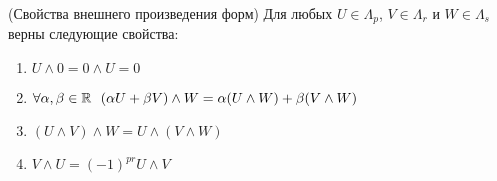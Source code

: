 \begin{theorem} (Свойства внешнего произведения форм)
	Для любых $U \in \Lambda_p$, $V \in \Lambda_r$ и $W \in \Lambda_s$ верны следующие свойства:
	\begin{enumerate}
		\item $U \wedge 0 = 0 \wedge U = 0$
		
		\item $\forall \alpha, \beta \in \R\ \ (\alpha U + \beta V) \wedge W = \alpha(U \wedge W) + \beta(V \wedge W)$
		
		\item $(U \wedge V) \wedge W = U \wedge (V \wedge W)$
		
		\item $V \wedge U = (-1)^{pr} U \wedge V$
	\end{enumerate}
\end{theorem}

